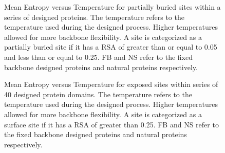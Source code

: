 \documentclass[12pt]{article}
\begin{document}
\begin{figure}[H]
\caption{Mean Entropy versus Temperature for partially buried sites within a series of designed proteins. The temperature refers to the temperature used during the designed process. Higher temperatures allowed for more backbone flexibility. A site is categorized as a partially buried site if it has a RSA of greater than or equal to 0.05 and less than or equal to 0.25. FB and NS refer to the fixed backbone designed proteins and natural proteins respectively.}
\label{Inter_Entropy_Noah}
\end{figure}

\begin{figure}[H]
\caption{Mean Entropy versus Temperature for exposed sites within series of 40 designed protein domains. The temperature refers to the temperature used during the designed process. Higher temperatures allowed for more backbone flexibility. A site is categorized as a surface site if it has a RSA of greater than 0.25. FB and NS refer to the fixed backbone designed proteins and natural proteins respectively.}
\label{Surface_Entropy_Noah}
\end{figure}
\end{document}
